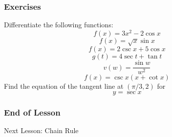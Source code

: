 \documentclass[xcolor=dvipsnames]{beamer}
\begin{document}
\begin{frame}
  \frametitle{Exercises}
Differentiate the following functions:
\begin{equation}
  \label{eq:hupuxahz}
  f(x)=3x^{2}-2\cos{}x
\end{equation}
\begin{equation}
  \label{eq:vithooke}
  f(x)=\sqrt{x}\sin{}x
\end{equation}
\begin{equation}
  \label{eq:chaequin}
  f(x)=2\csc{}x+5\cos{}x
\end{equation}
\begin{equation}
  \label{eq:hohxenoo}
  g(t)=4\sec{}t+\tan{}t
\end{equation}
\begin{equation}
  \label{eq:tohsohgh}
  v(w)=\frac{\sin{}w}{w^{2}}
\end{equation}
\begin{equation}
  \label{eq:zichoope}
  f(x)=\csc{}x(x+\cot{}x)
\end{equation}
Find the equation of the tangent line at $(\pi/3,2)$ for
\begin{equation}
  \label{eq:hoirohfo}
  y=\sec{}x
\end{equation}
\end{frame}

\begin{frame}
  \frametitle{End of Lesson}
Next Lesson: Chain Rule
\end{frame}
\end{document}
